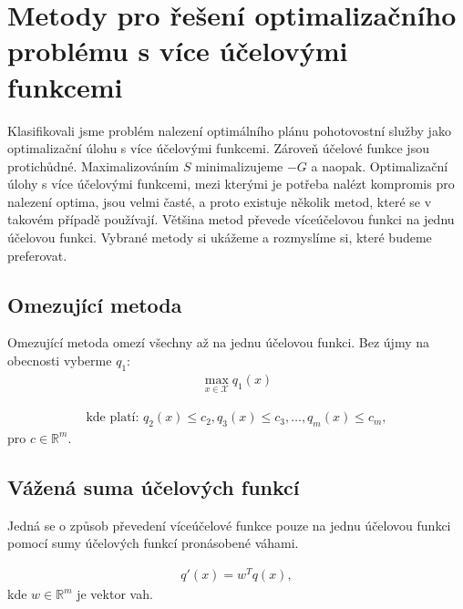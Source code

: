 \section{Metody pro řešení optimalizačního problému s více účelovými funkcemi}

Klasifikovali jsme problém nalezení optimálního plánu pohotovostní služby jako optimalizační úlohu s více účelovými funkcemi.
Zároveň účelové funkce jsou protichůdné. Maximalizováním $S$ minimalizujeme $-G$ a naopak.
Optimalizační úlohy s více účelovými funkcemi, mezi kterými je potřeba nalézt kompromis pro nalezení optima, jsou velmi časté,
a proto existuje několik metod, které se v takovém případě používají.
Většina metod převede víceúčelovou funkci na jednu účelovou funkci.
Vybrané metody si ukážeme a rozmyslíme si, které budeme preferovat. 

\subsection{Omezující metoda}

\begin{definice}
  Omezující metoda omezí všechny až na jednu účelovou funkci. Bez újmy na obecnosti vyberme $q_1$:
  \begin{align*}
    \max_{x \in \mathcal{X}} q_1(x)
  \end{align*}

  \begin{align}
    \text{kde platí: } q_2(x) \leq c_2, q_3(x) \leq c_3, \dots, q_m(x) \leq c_m,
  \end{align}
  pro $c \in \mathbb{R}^m$.
  \\
\end{definice}


\subsection{Vážená suma účelových funkcí}

Jedná se o způsob převedení víceúčelové funkce pouze na jednu účelovou funkci pomocí sumy účelových funkcí pronásobené váhami.

\begin{definice}
  \begin{align}
    q'(x) = w^T q(x),
  \end{align}
  kde $w \in \mathbb{R}^m$ je vektor vah.
  \\
\end{definice}


